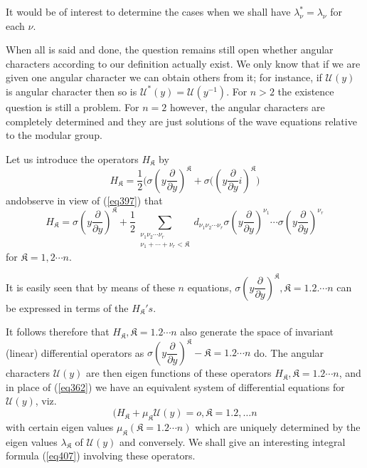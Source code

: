 It would be of interest to determine the cases when we shall have
$\lambda^*_\nu = \lambda_\nu$ for each $\nu$. 

When all is said and done, the question remains still open whether
angular characters according to our definition actually exist. We only
know that  if we are given one angular character we can obtain others
from it; for instance, if $\mathcal{U} (y)$ is angular character then
so  is $\mathcal{U}^* (y) = \mathcal{U} (y^{-1})$. For $n > 2$ the
existence question is still a problem. For $n=2$ however, the angular
characters are completely determined and they are just solutions of
the wave equations relative to the modular group. 

Let us introduce the operators $H_\mathfrak{K}$ by
\begin{equation*}
H_\mathfrak{K} = \frac{1}{2} (\sigma (y \frac{\partial}{\partial
  y})^\mathfrak{K} + \sigma \big ( ( y \frac{\partial}{\partial y } i
)^\mathfrak{K} \big) \tag{399}\label{eq399}  
\end{equation*}
and\pageoriginale observe in view of (\ref{eq397}) that  
$$
H_\mathfrak{K} = \sigma (y \frac{\partial}{\partial y})^\mathfrak{K} +
\frac{1}{2} \sum_{\substack{\nu_1 \nu_2 \cdots \nu_r \\ \nu_1 + \cdots
    + \nu_r < \mathfrak{K}}} d_{\nu_1 \nu_2 \cdots \nu_r} \sigma (y
\frac{\partial}{\partial y})^{\nu_1} \cdots \sigma (y
\frac{\partial}{\partial y})^{\nu_r} 
$$
for $\mathfrak{K} = 1, 2 \cdots n$.

It is easily seen that by means of these $n$ equations, $\sigma (y
\dfrac{\partial}{\partial y} )^\mathfrak{K} , \mathfrak{K} =
1. 2. \cdots n$ can be expressed in terms of the $H_\mathfrak{K}' s$. 

It follows therefore that $H_\mathfrak{K}, \mathfrak{K} = 1. 2 \cdots n$
also generate the space of invariant (linear) differential operators
as $\sigma (y \dfrac{\partial}{\partial y})^{\mathfrak{K}} -
\mathfrak{K} = 1.2 \cdots n$ do. The angular characters $\mathcal{U}
(y)$ are then eigen functions of these operators $H_\mathfrak{K},
\mathfrak{K} = 1.2 \cdots n$, and in place of (\ref{eq362}) we have an
equivalent system of differential equations for $\mathcal{U} (y)$,
viz.  
\begin{equation*}
(H_\mathfrak{K} + \mu_{\mathfrak{K}} \mathcal{U} (y) = o, \mathfrak{K} =
  1.2, \ldots n \tag{400}\label{eq400} 
\end{equation*}
with certain eigen values $\mu_{\mathfrak{K}} (\mathfrak{K} = 1.2 \cdots
n)$ which are uniquely determined by the eigen values
$\lambda_{\mathfrak{K}}$ of $\mathcal{U} (y)$ and conversely. We shall
give an interesting integral formula (\ref{eq407}) involving these
operators. 


